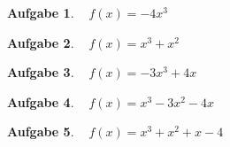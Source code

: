 \documentclass[12pt]{article}
\theoremstyle{note}
\newtheorem{aufgabe}{Aufgabe}
\begin{document}
\begin{flushleft}
\begin{aufgabe} ~  
$f(x)=$$- 4 x^{3}$
\end{aufgabe}\vspace{1em}\begin{aufgabe} ~  
$f(x)=$$x^{3} + x^{2}$
\end{aufgabe}\vspace{1em}\begin{aufgabe} ~  
$f(x)=$$- 3 x^{3} + 4 x$
\end{aufgabe}\vspace{1em}\begin{aufgabe} ~  
$f(x)=$$x^{3} - 3 x^{2} - 4 x$
\end{aufgabe}\vspace{1em}\begin{aufgabe} ~  
$f(x)=$$x^{3} + x^{2} + x - 4$
\end{aufgabe}\vspace{1em}
\end{flushleft} 
\end{document}
